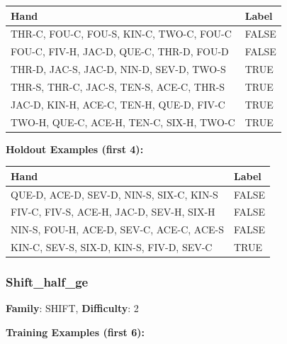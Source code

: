 \documentclass[10pt,a4paper]{article}
\begin{document}
\begin{small}
\begin{tabular}{p{8cm}l}
\toprule
Hand & Label \\
\midrule
THR-C, FOU-C, FOU-S, KIN-C, TWO-C, FOU-C & \textcolor{negative}{FALSE} \\
FOU-C, FIV-H, JAC-D, QUE-C, THR-D, FOU-D & \textcolor{negative}{FALSE} \\
THR-D, JAC-S, JAC-D, NIN-D, SEV-D, TWO-S & \textcolor{positive}{TRUE} \\
THR-S, THR-C, JAC-S, TEN-S, ACE-C, THR-S & \textcolor{positive}{TRUE} \\
JAC-D, KIN-H, ACE-C, TEN-H, QUE-D, FIV-C & \textcolor{positive}{TRUE} \\
TWO-H, QUE-C, ACE-H, TEN-C, SIX-H, TWO-C & \textcolor{positive}{TRUE} \\
\bottomrule
\end{tabular}
\end{small}

\textbf{Holdout Examples (first 4):}

\begin{small}
\begin{tabular}{p{8cm}l}
\toprule
Hand & Label \\
\midrule
QUE-D, ACE-D, SEV-D, NIN-S, SIX-C, KIN-S & \textcolor{negative}{FALSE} \\
FIV-C, FIV-S, ACE-H, JAC-D, SEV-H, SIX-H & \textcolor{negative}{FALSE} \\
NIN-S, FOU-H, ACE-D, SEV-C, ACE-C, ACE-S & \textcolor{negative}{FALSE} \\
KIN-C, SEV-S, SIX-D, KIN-S, FIV-D, SEV-C & \textcolor{positive}{TRUE} \\
\bottomrule
\end{tabular}
\end{small}

\vspace{0.5cm}

\subsubsection{Shift\_half\_ge}

\textbf{Family}: SHIFT, \textbf{Difficulty}: 2

\textbf{Training Examples (first 6):}
\end{document}
